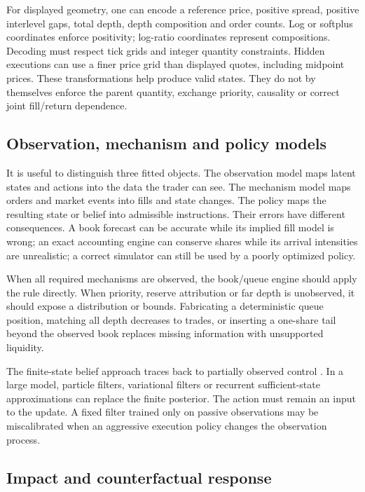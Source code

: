 \documentclass[11pt]{article}
\numberwithin{equation}{section}
\theoremstyle{definition}
\theoremstyle{remark}
\theoremstyle{definition}
\begin{document}
For displayed geometry, one can encode a reference price, positive spread,
positive interlevel gaps, total depth, depth composition and order counts.
Log or softplus coordinates enforce positivity; log-ratio coordinates represent
compositions. Decoding must respect tick grids and integer quantity constraints.
Hidden executions can use a finer price grid than displayed quotes, including
midpoint prices. These transformations help produce valid states. They do not
by themselves enforce the parent quantity, exchange priority, causality or
correct joint fill/return dependence.

\subsection{Observation, mechanism and policy models}

It is useful to distinguish three fitted objects. The observation model maps
latent states and actions into the data the trader can see. The mechanism model
maps orders and market events into fills and state changes. The policy maps
the resulting state or belief into admissible instructions. Their errors have
different consequences. A book forecast can be accurate while its implied
fill model is wrong; an exact accounting engine can conserve shares while its
arrival intensities are unrealistic; a correct simulator can still be used
by a poorly optimized policy.

When all required mechanisms are observed, the book/queue engine should apply
the rule directly. When priority, reserve attribution or far depth is unobserved,
it should expose a distribution or bounds. Fabricating a deterministic queue
position, matching all depth decreases to trades, or inserting a one-share
tail beyond the observed book replaces missing information with unsupported
liquidity.

The finite-state belief approach traces back to partially observed control
\citep{smallwood1973}. In a large model, particle filters, variational filters
or recurrent sufficient-state approximations can replace the finite posterior.
The action must remain an input to the update. A fixed filter trained only
on passive observations may be miscalibrated when an aggressive execution
policy changes the observation process.

\subsection{Impact and counterfactual response}
\end{document}
